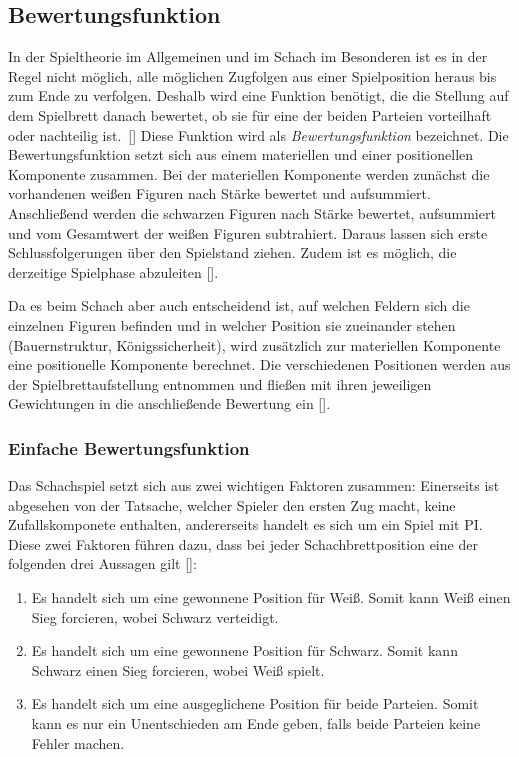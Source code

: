 \subsection{Bewertungsfunktion}

In der Spieltheorie im Allgemeinen und im Schach im Besonderen ist es in der Regel nicht möglich, alle möglichen Zugfolgen aus einer Spielposition heraus bis zum Ende zu verfolgen.
Deshalb \glqq [...] wird eine Funktion benötigt, die die Stellung auf dem Spielbrett danach bewertet,
ob sie für eine der beiden Parteien vorteilhaft oder nachteilig ist.\grqq \ [\cite{Paulsen2009}]
Diese Funktion wird als \textit{Bewertungsfunktion} bezeichnet.
Die Bewertungsfunktion setzt sich aus einem materiellen und einer positionellen Komponente zusammen.
Bei der materiellen Komponente werden zunächst die vorhandenen weißen Figuren nach Stärke bewertet und aufsummiert.
Anschließend werden die schwarzen Figuren nach Stärke bewertet, aufsummiert und vom Gesamtwert der weißen Figuren subtrahiert.
Daraus lassen sich erste Schlussfolgerungen über den Spielstand ziehen.
Zudem ist es möglich, die derzeitige Spielphase abzuleiten [\cite{Paulsen2009}].

Da es beim Schach aber auch entscheidend ist, auf welchen Feldern sich die einzelnen Figuren befinden und in welcher Position sie zueinander stehen (Bauernstruktur, Königssicherheit), wird zusätzlich zur materiellen Komponente eine positionelle Komponente berechnet.
Die verschiedenen Positionen werden aus der Spielbrettaufstellung entnommen und fließen mit ihren jeweiligen Gewichtungen in die anschließende Bewertung ein [\cite{Paulsen2009}].


\subsubsection{Einfache Bewertungsfunktion} \label{ch:simple-eval-function}

Das Schachspiel setzt sich aus zwei wichtigen Faktoren zusammen: Einerseits ist abgesehen von der Tatsache, welcher Spieler den ersten Zug macht, keine Zufallskomponete enthalten, andererseits handelt es sich um ein Spiel mit \gls{PI}.
Diese zwei Faktoren führen dazu, dass bei jeder Schachbrettposition eine der folgenden drei Aussagen gilt [\cite{Shannon1950}]:

\begin{enumerate}
    \item Es handelt sich um eine gewonnene Position für Weiß. Somit kann Weiß einen Sieg forcieren, wobei Schwarz verteidigt.
    \item Es handelt sich um eine gewonnene Position für Schwarz. Somit kann Schwarz einen Sieg forcieren, wobei Weiß spielt.
    \item Es handelt sich um eine ausgeglichene Position für beide Parteien. Somit kann es nur ein Unentschieden am Ende geben, falls beide Parteien keine Fehler machen.
\end{enumerate}

